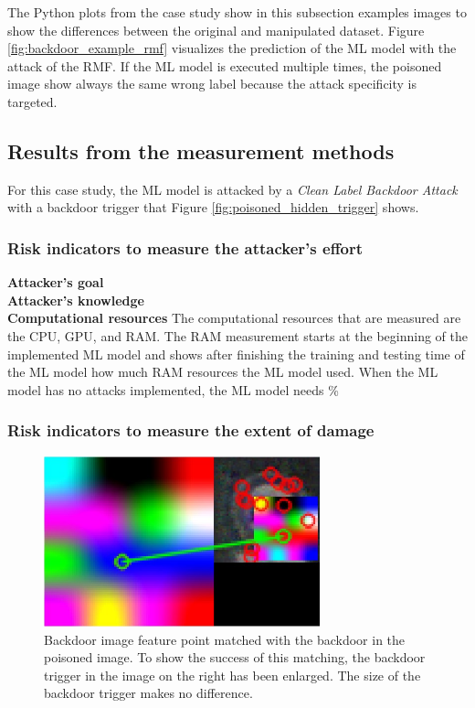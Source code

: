 The Python plots from the case study show in this subsection examples images to show the differences between the original and manipulated dataset. Figure \ref{fig:backdoor_example_rmf} visualizes the prediction of the ML model with the attack of the RMF. If the ML model is executed multiple times, the poisoned image show always the same wrong label because the attack specificity is targeted.

\subsection{Results from the measurement methods}

For this case study, the ML model is attacked by a \textit{Clean Label Backdoor Attack} with a backdoor trigger that Figure \ref{fig:poisoned_hidden_trigger} shows.

\subsubsection*{Risk indicators to measure the attacker's effort}
\textbf{Attacker's goal} \\
\textbf{Attacker's knowledge} \\
\textbf{Computational resources} The computational resources that are measured are the CPU, GPU, and RAM. The RAM measurement starts at the beginning of the implemented ML model and shows after finishing the training and testing time of the ML model how much RAM resources the ML model used. When the ML model has no attacks implemented, the ML model needs \%

\subsubsection*{Risk indicators to measure the extent of damage}

\begin{figure}[ht!]
  \centering
  \includegraphics[width=8cm]{pictures/feature_match.jpg}
  \caption{Backdoor image feature point matched with the backdoor in the poisoned image. To show the success of this matching, the backdoor trigger in the image on the right has been enlarged. The size of the backdoor trigger makes no difference.}
  \label{fig:feature_match}
\end{figure}

